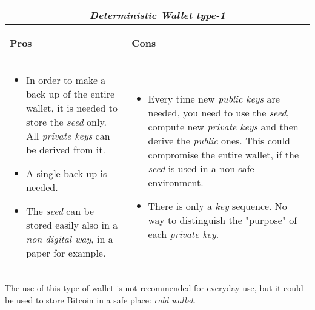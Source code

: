 \begin{center}
	\begin{tabular}{ |p{6cm}|p{6cm}|  }
		\hline
		\multicolumn{2}{|c|}{\textbf{\textit{Deterministic Wallet type-1}}} \\
		\hline \hline 
		\begin{center}
			\textbf{Pros}
		\end{center}&\begin{center}
			\textbf{Cons}
		\end{center}\\
		\hline
		\begin{itemize}
			\item In order to make a back up of the entire wallet, it is needed to store the \textit{seed} only. All \textit{private keys} can be derived from it.
			\item A single back up is needed.
			\item The \textit{seed} can be stored easily also in a \textit{non digital way}, in a paper for example.
		\end{itemize} &
		\begin{itemize}
			\item Every time new \textit{public keys} are needed, you need to use the \textit{seed}, compute new \textit{private keys} and then derive the \textit{public} ones. This could compromise the entire wallet, if the \textit{seed} is used in a non safe environment.
			\item There is only a \textit{key} sequence. No way to distinguish the "purpose" of each \textit{private key}.
		\end{itemize}\\
		\hline
	\end{tabular}
\end{center}
The use of this type of wallet is not recommended for everyday use, but it could be used to store Bitcoin in a safe place: \textit{cold wallet}. 

